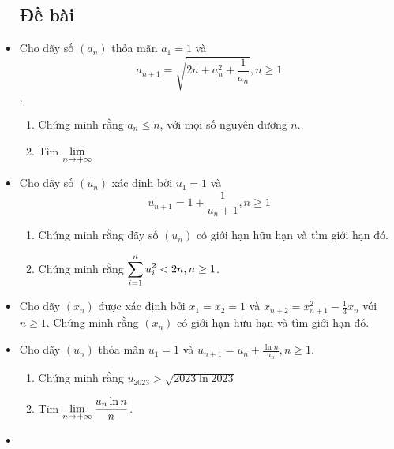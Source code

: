 \documentclass[11pt]{scrartcl}
\begin{document}
\begin{itemize}[label=, leftmargin=0em, itemsep=-0em]
    \subsection{\LARGE \textcolor{dk}{Đề bài}}
    \item \begin{btvn}
        Cho dãy số $(a_n)$ thỏa mãn $a_1 = 1$ và $$a_{n + 1} = \sqrt{2n + a_n^2 + \frac{1}{a_n}}, n \geq 1$$.
        \begin{enumerate}[label=(\alph*)]
            \item Chứng minh rằng $a_n \leq n$, với mọi số nguyên dương $n$.
            \item Tìm $\displaystyle\lim_{n \to +\infty}$
        \end{enumerate}
    \end{btvn}
    \item \begin{btvn}
        Cho dãy số $(u_n)$ xác định bởi $u_1 = 1$ và $$u_{n + 1} = 1 + \frac{1}{u_n + 1}, n \geq 1$$
        \begin{enumerate}[label=(\alph*)]
            \item Chứng minh rằng dãy số $(u_n)$ có giới hạn hữu hạn và tìm giới hạn đó.
            \item Chứng minh rằng $\displaystyle\sum_{i = 1}^n u_i^2 < 2n, n \geq 1$.
        \end{enumerate}
    \end{btvn}
    \item \begin{btvn}
        Cho dãy $(x_n)$ được xác định bởi $x_1 = x_2 = 1$ và $x_{n + 2} = x_{n + 1}^2 - \frac{1}{3}x_n$ với $n \geq 1$. Chứng minh rằng $(x_n)$ có giới hạn hữu hạn và tìm giới hạn đó.
    \end{btvn}
    \item \begin{btvn}
        Cho dãy $(u_n)$ thỏa mãn $u_1 = 1$ và $u_{n + 1} = u_n + \frac{\ln n}{u_n}, n \geq 1$.
        \begin{enumerate}[label=(\alph*)]
            \item Chứng minh rằng $u_{2023} > \sqrt{2023 \ln 2023}$
            \item Tìm $\dlim\frac{u_n  \ln n}{n}$.
        \end{enumerate}
    \end{btvn}
    \item \begin{btvn}

\end{btvn}
\end{itemize}
\end{document}
